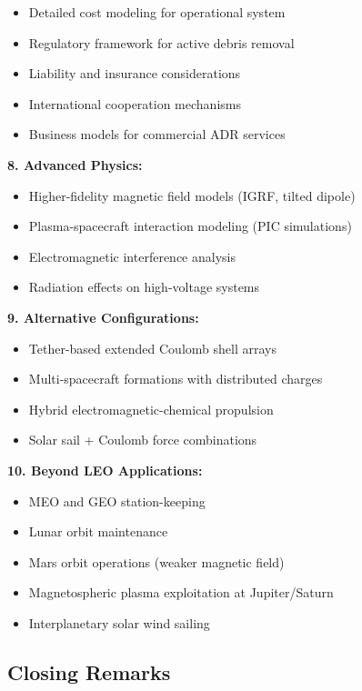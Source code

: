 \documentclass[12pt,a4paper]{article}
\begin{document}
\begin{itemize}
\item Detailed cost modeling for operational system
\item Regulatory framework for active debris removal
\item Liability and insurance considerations
\item International cooperation mechanisms
\item Business models for commercial ADR services
\end{itemize}

\textbf{8. Advanced Physics:}

\begin{itemize}
\item Higher-fidelity magnetic field models (IGRF, tilted dipole)
\item Plasma-spacecraft interaction modeling (PIC simulations)
\item Electromagnetic interference analysis
\item Radiation effects on high-voltage systems
\end{itemize}

\textbf{9. Alternative Configurations:}

\begin{itemize}
\item Tether-based extended Coulomb shell arrays
\item Multi-spacecraft formations with distributed charges
\item Hybrid electromagnetic-chemical propulsion
\item Solar sail + Coulomb force combinations
\end{itemize}

\textbf{10. Beyond LEO Applications:}

\begin{itemize}
\item MEO and GEO station-keeping
\item Lunar orbit maintenance
\item Mars orbit operations (weaker magnetic field)
\item Magnetospheric plasma exploitation at Jupiter/Saturn
\item Interplanetary solar wind sailing
\end{itemize}

\subsection{Closing Remarks}
\end{document}
